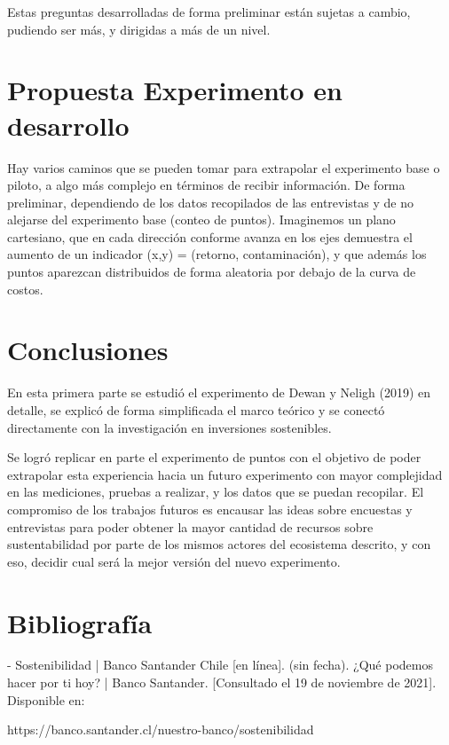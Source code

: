 \documentclass[11pt,letterpaper]{article}
\begin{document}
\begin{enumerate}
Estas preguntas desarrolladas de forma preliminar están sujetas a cambio, pudiendo ser más, y dirigidas a más de un nivel.

\section{Propuesta Experimento en desarrollo}

Hay varios caminos que se pueden tomar para extrapolar el experimento base o piloto, a algo más complejo en términos de recibir información. De forma preliminar, dependiendo de los datos recopilados de las entrevistas y de no alejarse del experimento base (conteo de puntos).
Imaginemos un plano cartesiano, que en cada dirección conforme avanza en los ejes demuestra el aumento de un indicador (x,y) = (retorno, contaminación), y que además los puntos aparezcan distribuidos de forma aleatoria por debajo de la curva de costos. 

\section{Conclusiones}

En esta primera parte se estudió el experimento de Dewan y Neligh (2019) en detalle, se explicó de forma simplificada el marco teórico y se conectó directamente con la investigación en inversiones sostenibles. 

Se logró replicar en parte el experimento de puntos con el objetivo de poder extrapolar esta experiencia hacia un futuro experimento con mayor complejidad en las mediciones, pruebas a realizar, y los datos que se puedan recopilar. 
El compromiso de los trabajos futuros es encausar las ideas sobre encuestas y entrevistas para poder obtener la mayor cantidad de recursos sobre sustentabilidad por parte de los mismos actores del ecosistema descrito, y con eso, decidir cual será la mejor versión del nuevo experimento.

\newpage

\section{Bibliografía}

- Sostenibilidad | Banco Santander Chile [en línea]. (sin fecha). ¿Qué podemos hacer por ti hoy? | Banco Santander. [Consultado el 19 de noviembre de 2021]. Disponible en:

https://banco.santander.cl/nuestro-banco/sostenibilidad


\end{enumerate}
\end{document}
